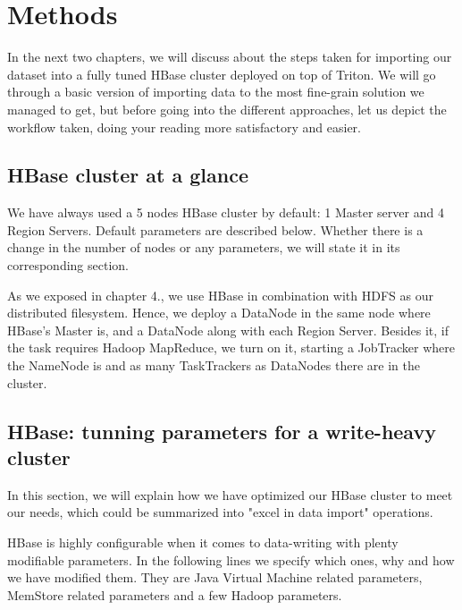 \chapter{Methods}
\label{chapter:methods}



In the next two chapters, we will discuss about the steps taken for importing our dataset into a fully tuned HBase cluster deployed on top of Triton. We will go through a basic version of importing data to the most fine-grain solution we managed to get, but before going into the different approaches, let us depict the workflow taken, doing your reading more satisfactory and easier.

\bigskip
\centerline{}
\bigskip



\section{HBase cluster at a glance}

We have always used a 5 nodes HBase cluster by default: 1 Master server and 4 Region Servers. Default parameters are described below. Whether there is a change in the number of nodes or any parameters, we will state it in its corresponding section.
\par
As we exposed in chapter 4., we use HBase in combination with HDFS as our distributed filesystem. Hence, we deploy a DataNode in the same node where HBase's Master is, and a DataNode along with each Region Server. Besides it, if the task requires Hadoop MapReduce, we turn on it, starting a JobTracker where the NameNode is and as many TaskTrackers as DataNodes there are in the cluster.

\section{HBase: tunning parameters for a write-heavy cluster}

In this section, we will explain how we have optimized our HBase cluster to meet our needs, which could be summarized into "excel in data import" operations.
\par
HBase is highly configurable when it comes to data-writing with plenty modifiable parameters. In the following lines we specify which ones, why and how we have modified them. They are Java Virtual Machine related parameters, MemStore related parameters and a few Hadoop parameters.

